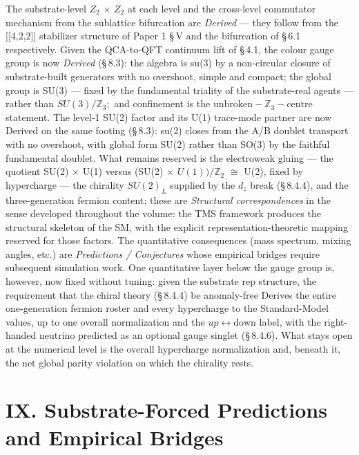 \documentclass[11pt,oneside]{report}
\theoremstyle{definition}
\theoremstyle{remark}
\begin{document}
The substrate-level \ensuremath{Z_{2}} \ensuremath{\times} \ensuremath{Z_{2}} at each level and the cross-level commutator
mechanism from the sublattice bifurcation are \emph{Derived} --- they
follow from the [[4,2,2]] stabilizer structure of Paper 1 \S\,V and
the bifurcation of \S\,6.1 respectively. Given the QCA-to-QFT continuum
lift of \S\,4.1, the colour gauge group is now \emph{Derived} (\S\,8.3): the
algebra is su(3) by a non-circular closure of substrate-built generators
with no overshoot, simple and compact; the global group is SU(3) ---
fixed by the fundamental triality of the substrate-real agents ---
rather than \ensuremath{SU(3)/\mathbb{Z}_{3};} and confinement is the \ensuremath{\text{unbroken}-\mathbb{Z}_{3}-\text{centre}}
statement. The level-1 SU(2) factor and its U(1) trace-mode partner are
now Derived on the same footing (\S\,8.3): su(2) closes from the A/B
doublet transport with no overshoot, with global form SU(2) rather than
SO(3) by the faithful fundamental doublet. What remains reserved is the
electroweak gluing --- the quotient SU(2) \ensuremath{\times} U(1) versus (SU(2) \ensuremath{\times}
\ensuremath{U(1))/\mathbb{Z}_{2}} \ensuremath{\cong} U(2), fixed by hypercharge --- the chirality \ensuremath{SU(2)_{L}}
supplied by the \ensuremath{d_{z}} break (\S\,8.4.4), and the three-generation fermion
content; these are \emph{Structural correspondences} in the sense
developed throughout the volume: the TMS framework produces the
structural skeleton of the SM, with the explicit
representation-theoretic mapping reserved for those factors. The
quantitative consequences (mass spectrum, mixing angles, etc.) are
\emph{Predictions / Conjectures} whose empirical bridges require
subsequent simulation work. One quantitative layer below the gauge group
is, however, now fixed without tuning: given the substrate rep
structure, the requirement that the chiral theory (\S\,8.4.4) be
anomaly-free Derives the entire one-generation fermion roster and every
hypercharge to the Standard-Model values, up to one overall
normalization and the \ensuremath{up\leftrightarrow \text{down}} label, with the right-handed neutrino
predicted as an optional gauge singlet (\S\,8.4.6). What stays open at the
numerical level is the overall hypercharge normalization and, beneath
it, the net global parity violation on which the chirality rests.

\section*{IX. Substrate-Forced Predictions and Empirical Bridges}
\end{document}
